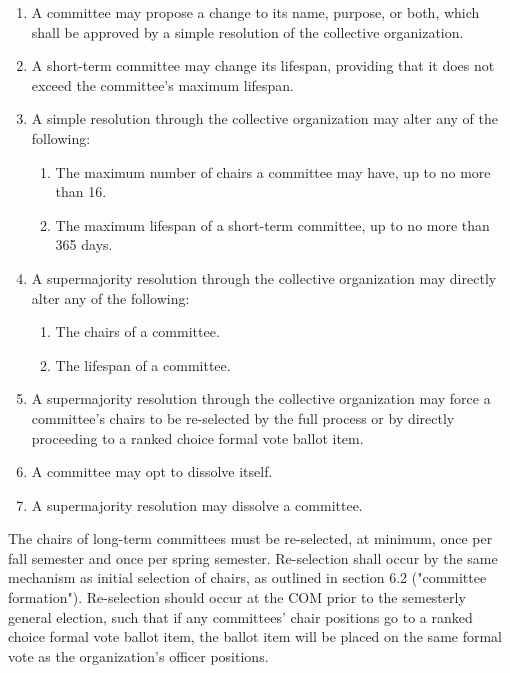 \documentclass[11pt]{article}
\newcounter{h1}
\newcounter{h2}[h1]
\newcounter{h3}[h2]
\begin{document}
\begin{enumerate}
\begin{enumerate}
  \end{enumerate}
  \item A committee may propose a change to its name, purpose, or both, which shall be approved by a simple resolution of the collective organization.
  \item A short-term committee may change its lifespan, providing that it does not exceed the committee's maximum lifespan.
  \item A simple resolution through the collective organization may alter any of the following:
  \begin{enumerate}
    \item The maximum number of chairs a committee may have, up to no more than 16.
    \item The maximum lifespan of a short-term committee, up to no more than 365 days.
  \end{enumerate}
  \item A supermajority resolution through the collective organization may directly alter any of the following:
  \begin{enumerate}
    \item The chairs of a committee.
    \item The lifespan of a committee.
  \end{enumerate}
  \item A supermajority resolution through the collective organization may force a committee's chairs to be re-selected by the full process or by directly proceeding to a ranked choice formal vote ballot item.
  \item A committee may opt to dissolve itself.
  \item A supermajority resolution may dissolve a committee.
\end{enumerate}


The chairs of long-term committees must be re-selected, at minimum, once per fall semester and once per spring semester. Re-selection shall occur by the same mechanism as initial selection of chairs, as outlined in section 6.2 ("committee formation"). Re-selection should occur at the COM prior to the semesterly general election, such that if any committees' chair positions go to a ranked choice formal vote ballot item, the ballot item will be placed on the same formal vote as the organization's officer positions.

\end{document}
